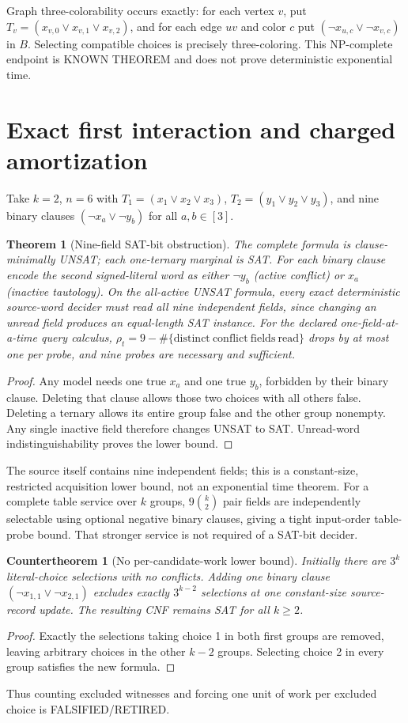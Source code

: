 \documentclass[10pt]{article}
\newtheorem{theorem}{Theorem}
\newtheorem{countertheorem}{Countertheorem}
\begin{document}
Graph three-colorability occurs exactly: for each vertex $v$, put $T_v=(x_{v,0}\lor x_{v,1}\lor x_{v,2})$, and for each edge $uv$ and color $c$ put $(\neg x_{u,c}\lor\neg x_{v,c})$ in $B$. Selecting compatible choices is precisely three-coloring. This NP-complete endpoint is KNOWN THEOREM and does not prove deterministic exponential time.

\section{Exact first interaction and charged amortization}
Take $k=2$, $n=6$ with $T_1=(x_1\lor x_2\lor x_3)$, $T_2=(y_1\lor y_2\lor y_3)$, and nine binary clauses $(\neg x_a\lor\neg y_b)$ for all $a,b\in[3]$.
\begin{theorem}[Nine-field SAT-bit obstruction]
The complete formula is clause-minimally UNSAT; each one-ternary marginal is SAT. For each binary clause encode the second signed-literal word as either $\neg y_b$ (active conflict) or $x_a$ (inactive tautology). On the all-active UNSAT formula, every exact deterministic source-word decider must read all nine independent fields, since changing an unread field produces an equal-length SAT instance. For the declared one-field-at-a-time query calculus,
$\rho_t=9-\#\{\mathrm{distinct\ conflict\ fields\ read}\}$ drops by at most one per probe, and nine probes are necessary and sufficient.
\end{theorem}
\begin{proof}
Any model needs one true $x_a$ and one true $y_b$, forbidden by their binary clause. Deleting that clause allows those two choices with all others false. Deleting a ternary allows its entire group false and the other group nonempty. Any single inactive field therefore changes UNSAT to SAT. Unread-word indistinguishability proves the lower bound.
\end{proof}
The source itself contains nine independent fields; this is a constant-size, restricted acquisition lower bound, not an exponential time theorem. For a complete table service over $k$ groups, $9\binom{k}{2}$ pair fields are independently selectable using optional negative binary clauses, giving a tight input-order table-probe bound. That stronger service is not required of a SAT-bit decider.

\begin{countertheorem}[No per-candidate-work lower bound]
Initially there are $3^k$ literal-choice selections with no conflicts. Adding one binary clause $(\neg x_{1,1}\lor\neg x_{2,1})$ excludes exactly $3^{k-2}$ selections at one constant-size source-record update. The resulting CNF remains SAT for all $k\ge2$.
\end{countertheorem}
\begin{proof}
Exactly the selections taking choice 1 in both first groups are removed, leaving arbitrary choices in the other $k-2$ groups. Selecting choice 2 in every group satisfies the new formula.
\end{proof}
Thus counting excluded witnesses and forcing one unit of work per excluded choice is FALSIFIED/RETIRED.
\end{document}
